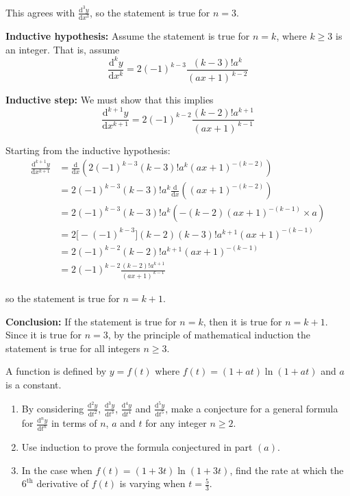\documentclass[leqno]{article}
\begin{document}
\begin{enumerate}[
  label=\textbf{\arabic*.},
  leftmargin=*,
  topsep=0pt,
  partopsep=0pt,
  parsep=0pt
]
\begin{djsSolution}
This agrees with \(\frac{\mathrm{d}^3y}{\mathrm{d}x^3}\), so the statement is true for \(n=3\).

\textbf{Inductive hypothesis:} Assume the statement is true for \(n=k\), where \(k\ge 3\) is an integer. That is, assume
\[
\frac{\mathrm{d}^k y}{\mathrm{d}x^k}=2(-1)^{k-3}\frac{(k-3)!a^k}{(ax+1)^{\,k-2}}
\]

\textbf{Inductive step:} We must show that this implies
\[
\frac{\mathrm{d}^{k+1} y}{\mathrm{d}x^{k+1}}=2(-1)^{k-2}\frac{(k-2)!a^{k+1}}{(ax+1)^{\,k-1}}
\]

Starting from the inductive hypothesis:
\begin{align*}
\frac{\mathrm{d}^{k+1} y}{\mathrm{d}x^{k+1}}
&=\frac{\mathrm{d}}{\mathrm{d}x}\left(2(-1)^{k-3}(k-3)!a^k(ax+1)^{-(k-2)}\right)\\
&=2(-1)^{k-3}(k-3)!a^k\frac{\mathrm{d}}{\mathrm{d}x}\left((ax+1)^{-(k-2)}\right)\\
&=2(-1)^{k-3}(k-3)!a^k\left(-(k-2)(ax+1)^{-(k-1)}\times a\right)\\
&=2\bigl[-(-1)^{k-3}\bigr](k-2)(k-3)!a^{k+1}(ax+1)^{-(k-1)}\\
&=2(-1)^{k-2}(k-2)!a^{k+1}(ax+1)^{-(k-1)}\\
&=2(-1)^{k-2}\frac{(k-2)!a^{k+1}}{(ax+1)^{\,k-1}}
\end{align*}

so the statement is true for \(n=k+1\).

\textbf{Conclusion:} If the statement is true for \(n=k\), then it is true for \(n=k+1\). Since it is true for \(n=3\), by the principle of mathematical induction the statement is true for all integers \(n\ge 3\).
\end{djsSolution}


\newpage

\questionitem

A function is defined by $y=f(t)$ where $f(t)=(1+at)\ln(1+at)$ and $a$ is a constant. \\

\begin{enumerate}[label=\textbf{(\alph*)}]
  \item By considering $\frac{\mathrm{d}^2y}{\mathrm{d}t^2}$, $\frac{\mathrm{d}^3y}{\mathrm{d}t^3}$, $\frac{\mathrm{d}^4y}{\mathrm{d}t^4}$ and $\frac{\mathrm{d}^5y}{\mathrm{d}t^5}$, make a conjecture for a general formula for $\frac{\mathrm{d}^n y}{\mathrm{d}t^n}$ in terms of $n$, $a$ and $t$ for any integer $n \ge 2$.  \\
  \item Use induction to prove the formula conjectured in part $(a)$.  \\
  \item In the case when $f(t)=(1+3t)\ln(1+3t)$, find the rate at which the $6^{\mathrm{th}}$ derivative of $f(t)$ is varying when $t=\frac{5}{3}$.  \\
\end{enumerate}


\end{enumerate}
\end{document}
